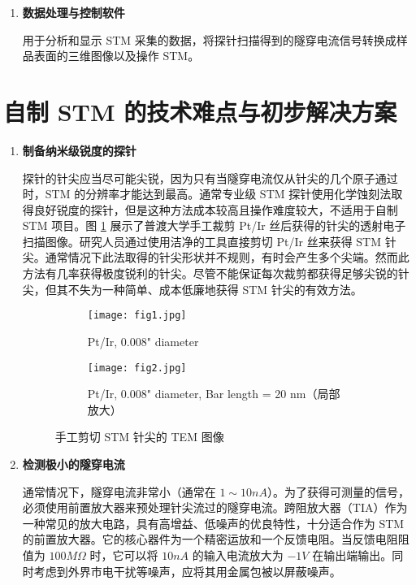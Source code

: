 \documentclass{article}
\begin{document}
\begin{spacing}{1.625}
\begin{enumerate}
		\item \textbf{数据处理与控制软件}\par
		\qquad 用于分析和显示 STM 采集的数据，将探针扫描得到的隧穿电流信号转换成样品表面的三维图像以及操作 STM。
		
	\end{enumerate}
	
	
	
	
	
	
	
	
	
	
	\clearpage
	\section{自制 STM 的技术难点与初步解决方案}
	\setParDis %
	
	\begin{enumerate}
		\item \textbf{制备纳米级锐度的探针}\par
		\qquad 探针的针尖应当尽可能尖锐，因为只有当隧穿电流仅从针尖的几个原子通过时，STM 的分辨率才能达到最高。通常专业级 STM 探针使用化学蚀刻法取得良好锐度的探针，但是这种方法成本较高且操作难度较大，不适用于自制 STM 项目。图 \ref{fig5} 展示了普渡大学手工裁剪 Pt/Ir 丝后获得的针尖的透射电子扫描图像\cite{ref19}。研究人员通过使用洁净的工具直接剪切 Pt/Ir 丝来获得 STM 针尖。通常情况下此法取得的针尖形状并不规则，有时会产生多个尖端。然而此方法有几率获得极度锐利的针尖。尽管不能保证每次裁剪都获得足够尖锐的针尖，但其不失为一种简单、成本低廉地获得 STM 针尖的有效方法。
		
		\begin{figure}[!h]
			\centering
			\begin{subfigure}{0.35\linewidth}
				\centering
				\texttt{[image: fig1.jpg]}
				\caption{Pt/Ir, 0.008" diameter\\\quad}
			\end{subfigure}
			\hskip 1.5cm
			\begin{subfigure}{0.35\linewidth}
				\centering
				\texttt{[image: fig2.jpg]}
				\caption{Pt/Ir, 0.008" diameter, Bar length = 20 nm（局部放大）}
			\end{subfigure}
			\caption{手工剪切 STM 针尖的 TEM 图像}
			\label{fig5}
		\end{figure}
		
		
		
		\item \textbf{检测极小的隧穿电流}\par
		\qquad 通常情况下，隧穿电流非常小（通常在 $1\sim10nA$）。为了获得可测量的信号，必须使用前置放大器来预处理针尖流过的隧穿电流。跨阻放大器（TIA）作为一种常见的放大电路，具有高增益、低噪声的优良特性，十分适合作为 STM 的前置放大器。它的核心器件为一个精密运放和一个反馈电阻。当反馈电阻阻值为 $100M\Omega$ 时，它可以将 $10nA$ 的输入电流放大为 $-1V$ 在输出端输出\cite{ref11,ref12,ref17}。同时考虑到外界市电干扰等噪声，应将其用金属包被以屏蔽噪声。
		

\end{enumerate}
\end{spacing}
\end{document}
